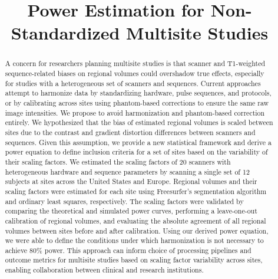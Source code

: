 \documentclass{article}
\begin{document}
\title{Power Estimation for Non-Standardized Multisite Studies}
\begin{abstract}%

A concern for researchers planning multisite studies is that scanner and T1-weighted sequence-related biases on regional volumes could overshadow true effects, especially for studies with a heterogeneous set of scanners and sequences. Current approaches attempt to harmonize data by standardizing hardware, pulse sequences, and protocols, or by calibrating across sites using phantom-based corrections to ensure the same raw image intensities. We propose to avoid harmonization and phantom-based correction entirely.  We hypothesized that the bias of estimated regional volumes is scaled between sites due to the contrast and gradient distortion differences between scanners and sequences. Given this assumption, we provide a new statistical framework and derive a power equation to define inclusion criteria for a set of sites based on the variability of their scaling factors. We estimated the scaling factors of 20 scanners with heterogeneous hardware and sequence parameters by scanning a single set of 12 subjects at sites across the United States and Europe. Regional volumes and their scaling factors were estimated for each site using Freesurfer's segmentation algorithm and ordinary least squares, respectively. The scaling factors were validated by comparing the theoretical and simulated power curves, performing a leave-one-out calibration of regional volumes, and evaluating the absolute agreement of all regional volumes between sites before and after calibration. Using our derived power equation, we were able to define the conditions under which harmonization is not necessary to achieve 80\% power. This approach can inform choice of processing pipelines and outcome metrics for multisite studies based on scaling factor variability across sites, enabling collaboration between clinical and research institutions.\end{abstract}
\end{document}
